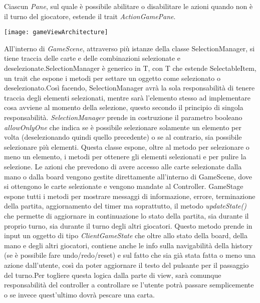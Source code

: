Ciascun \textit{Pane}, sul quale è possibile abilitare o disabilitare le azioni quando non è il turno del giocatore, estende il trait \textit{ActionGamePane}.
\newline 
\begin{center}
    \texttt{[image: gameViewArchitecture]}
\end{center}
All’interno di \textit{GameScene}, attraverso più istanze della classe SelectionManager, si tiene traccia delle carte e delle combinazioni selezionate e deselezionate.\newline SelectionManager è generico in T, con T che estende SelectableItem, un trait che espone i metodi per settare un oggetto come selezionato o deselezionato.\newline Così facendo, SelectionManager avrà la sola responsabilità di tenere traccia degli elementi selezionati, mentre sarà l’elemento stesso ad implementare cosa avviene al momento della selezione, questo secondo il principio di singola responsabilità. \newline \newline
\textit{SelectionManager} prende in costruzione il parametro booleano \textit{allowOnlyOne} che indica se è possibile selezionare solamente un elemento per volta (deselezionando quindi quello precedente) o se al contrario, sia possibile selezionare più elementi. \newline Questa classe espone, oltre al metodo per selezionare o meno un elemento, i metodi per ottenere gli elementi selezionati e per pulire la selezione. \newline \newline
Le azioni che prevedono di avere accesso alle carte selezionate dalla mano o dalla board vengono gestite direttamente all’interno di GameScene, dove si ottengono le carte selezionate e vengono mandate al Controller. \newline \newline
GameStage espone tutti i metodi per mostrare messaggi di informazione, errore, terminazione della partita, aggiornamento del timer ma soprattutto, il metodo \textit{updateState()} che permette di aggiornare in continuazione lo stato della partita, sia durante il proprio turno, sia durante il turno degli altri giocatori.
\newline \newline
Questo metodo prende in input un oggetto di tipo \textit{ClientGameState} che oltre allo stato della board, della mano e degli altri giocatori, contiene anche le info sulla navigabilità della history (se è possibile fare undo/redo/reset) e sul fatto che sia già stata fatta o meno una azione dall’utente, così da poter aggiornare il testo del pulsante per il passaggio del turno.\newline Per togliere questa logica dalla parte di view, sarà comunque responsabilità del controller a controllare se l’utente potrà passare semplicemente o se invece quest’ultimo dovrà pescare una carta.
